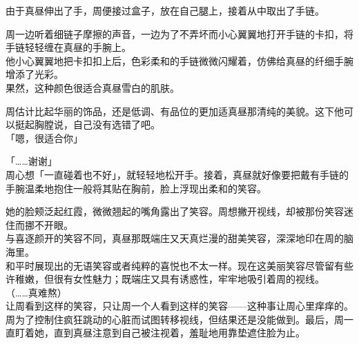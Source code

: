 由于真昼伸出了手，周便接过盒子，放在自己腿上，接着从中取出了手链。

周一边听着细链子摩擦的声音，一边为了不弄坏而小心翼翼地打开手链的卡扣，将手链轻轻缠在真昼的手腕上。\\

他小心翼翼地把卡扣扣上后，色彩柔和的手链微微闪耀着，仿佛给真昼的纤细手腕增添了光彩。\\

果然，这种颜色很适合真昼雪白的肌肤。

周估计比起华丽的饰品，还是低调、有品位的更加适真昼那清纯的美貌。这下他可以挺起胸膛说，自己没有选错了吧。\\

「嗯，很适合你」

「……谢谢」\\

周心想「一直碰着也不好」，就轻轻地松开手。接着，真昼就好像要把戴有手链的手腕温柔地抱住一般将其贴在胸前，脸上浮现出柔和的笑容。

她的脸颊泛起红霞，微微翘起的嘴角露出了笑容。周想撇开视线，却被那份笑容迷住而挪不开眼。\\

与喜逐颜开的笑容不同，真昼那既端庄又天真烂漫的甜美笑容，深深地印在周的脑海里。\\%

和平时展现出的无语笑容或者纯粹的喜悦也不太一样。现在这美丽笑容尽管留有些许稚嫩，但很有女性魅力；既端庄又具有诱惑性，牢牢地吸引着周的视线。\\

（……真难熬）\\

让周看到这样的笑容，只让周一个人看到这样的笑容——这种事让周心里痒痒的。\\

周为了控制住疯狂跳动的心脏而试图转移视线，但结果还是没能做到。最后，周一直盯着她，直到真昼注意到自己被注视着，羞耻地用靠垫遮住脸为止。
